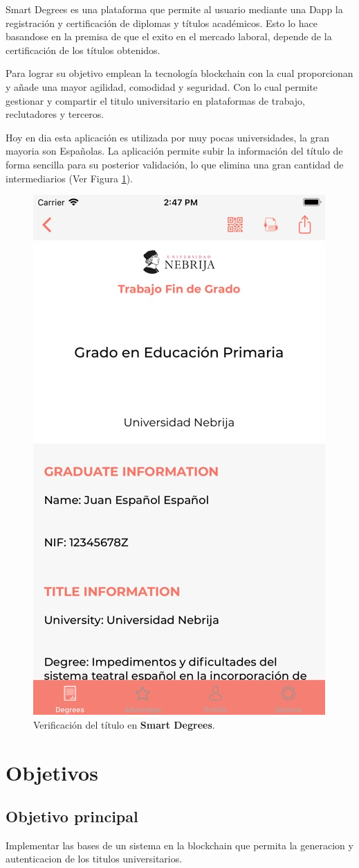 \documentclass[11pt,a4paper]{article}
\begin{document}
        Smart Degrees \cite{smart-degrees} es una plataforma que permite al usuario mediante una Dapp la registración y
        certificación de diplomas y títulos académicos. Esto lo hace basandose en la premisa de que el 
        exito en el mercado laboral, depende de la certificación de los títulos obtenidos.

        Para lograr su objetivo emplean la tecnología blockchain con la cual proporcionan y añade una mayor agilidad,
        comodidad y seguridad. Con lo cual permite gestionar y compartir el titulo universitario en plataformas de trabajo, 
        reclutadores y terceros.

        Hoy en dia esta aplicación es utilizada por muy pocas universidades, la gran mayoria son Españolas. 
        La aplicación permite subir la información del título de forma sencilla para su posterior validación, 
        lo que elimina una gran cantidad de intermediarios (Ver Figura \ref{fig:smart-degrees}).
        
        \begin{figure}
            \centering
            \includegraphics[width=.3\textwidth]{Img/smart-degrees.jpeg}
            \caption{Verificación del título en \textbf{Smart Degrees}.}
            \label{fig:smart-degrees}
        \end{figure}


    \section{Objetivos}

        \subsection{Objetivo principal}

        Implementar las bases de un sistema en la blockchain que permita la generacion 
        y autenticacion de los titulos universitarios. 
        
\end{document}

